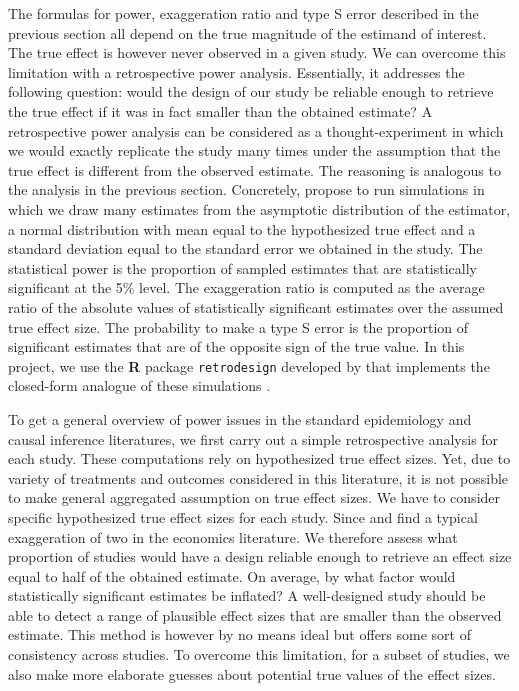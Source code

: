 \documentclass[12pt]{article}
\begin{document}
    The formulas for power, exaggeration ratio and type S error described in the previous section all depend on the true magnitude of the estimand of interest. The true effect is however never observed in a given study.  We can overcome this limitation with a retrospective power analysis. Essentially, it addresses the following question: would the design of our study be reliable enough to retrieve the true effect if it was in fact smaller than the obtained estimate? A retrospective power analysis can be considered as a thought-experiment in which we would exactly replicate the study many times under the assumption that the true effect is different from the observed estimate. The reasoning is analogous to the analysis in the previous section. Concretely, \cite{gelman_beyond_2014} propose to run simulations in which we draw many estimates from the asymptotic distribution of the estimator, a normal distribution with mean equal to the hypothesized true effect and a standard deviation equal to the standard error we obtained in the study. The statistical power is the proportion of sampled estimates that are statistically significant at the 5\% level. The exaggeration ratio is computed as the average ratio of the absolute values of statistically significant estimates over the assumed true effect size. The probability to make a type S error is the proportion of significant estimates that are of the opposite sign of the true value. In this project, we use the \textbf{\textsf{R}} package \texttt{retrodesign} developed by \cite{timm_retrodesign_2019} that implements the closed-form analogue of these simulations \citep{lu_note_2019}.
    
    To get a general overview of power issues in the standard epidemiology and causal inference literatures, we first carry out a simple retrospective analysis for each study. These computations rely on hypothesized true effect sizes. Yet, due to variety of treatments and outcomes considered in this literature, it is not possible to make general aggregated assumption on true effect sizes. We have to consider specific hypothesized true effect sizes for each study. Since \cite{ioannidis_power_2017} and \cite{ferraro_featureis_2020} find a typical exaggeration of two in the economics literature. We therefore assess what proportion of studies would have a design reliable enough to retrieve an effect size equal to half of the obtained estimate. On average, by what factor would statistically significant estimates be inflated? A well-designed study should be able to detect a range of plausible effect sizes that are smaller than the observed estimate. This method is however by no means ideal but offers some sort of consistency across studies. To overcome this limitation, for a subset of studies, we also make more elaborate guesses about potential true values of the effect sizes. 
    
\end{document}
